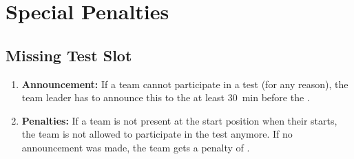 \newcommand{\penaltybig}{500~}
\newcommand{\penaltysmall}{250~}


\section{Special Penalties}
\label{sec:rules:penaltiesbonuses}

\subsection{Missing Test Slot}
\label{sec:rules:missingslot}
\begin{enumerate}
	\item \textbf{Announcement:} If a team cannot participate in a test (for any reason), the team leader has to announce this to the  at least \SI{30}{\minute} before the \Testblock{}.

	\item \textbf{Penalties:} If a team is not present at the start position when their \Testslot{} starts, the team is not allowed to participate in the test anymore. If no announcement was made, the team gets a penalty of \scoring{\penaltysmall points}.
\end{enumerate}


